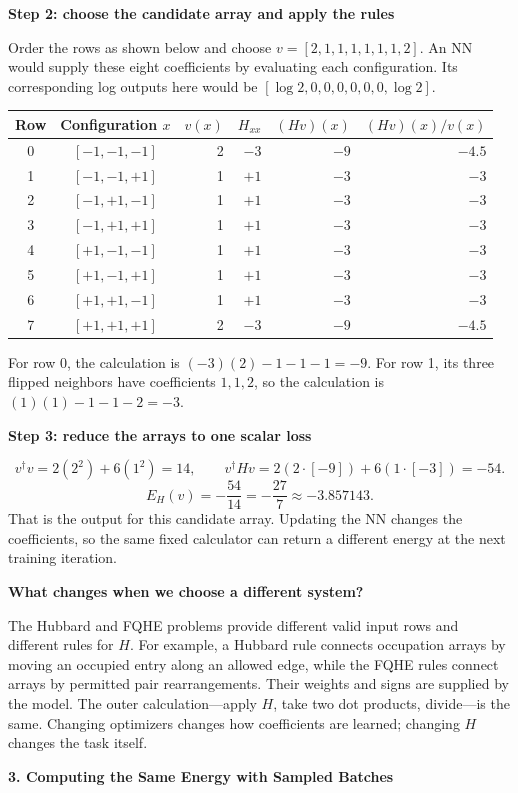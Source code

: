 \documentclass[11pt,letterpaper]{article}
\newcommand{\topic}[1]{\vspace{4pt}\textbf{\color{ink}#1}\par}
\newcommand{\pagetitle}[1]{\begin{center}{\Large\bfseries #1}\end{center}}
\begin{document}
\topic{Step 2: choose the candidate array and apply the rules}
Order the rows as shown below and choose $v=[2,1,1,1,1,1,1,2]$. An NN would supply these eight coefficients by evaluating each configuration. Its corresponding log outputs here would be $[\log2,0,0,0,0,0,0,\log2]$.
\begin{center}\small
\begin{tabular}{@{}ccrrrr@{}}
\toprule
Row & Configuration $x$ & $v(x)$ & $H_{xx}$ & $(Hv)(x)$ & $(Hv)(x)/v(x)$\\
\midrule
0 & $[-1,-1,-1]$ & 2 & $-3$ & $-9$ & $-4.5$\\
1 & $[-1,-1,+1]$ & 1 & $+1$ & $-3$ & $-3$\\
2 & $[-1,+1,-1]$ & 1 & $+1$ & $-3$ & $-3$\\
3 & $[-1,+1,+1]$ & 1 & $+1$ & $-3$ & $-3$\\
4 & $[+1,-1,-1]$ & 1 & $+1$ & $-3$ & $-3$\\
5 & $[+1,-1,+1]$ & 1 & $+1$ & $-3$ & $-3$\\
6 & $[+1,+1,-1]$ & 1 & $+1$ & $-3$ & $-3$\\
7 & $[+1,+1,+1]$ & 2 & $-3$ & $-9$ & $-4.5$\\
\bottomrule
\end{tabular}
\end{center}
For row 0, the calculation is $(-3)(2)-1-1-1=-9$. For row 1, its three flipped neighbors have coefficients $1,1,2$, so the calculation is $(1)(1)-1-1-2=-3$.

\topic{Step 3: reduce the arrays to one scalar loss}
\[
 v^\dagger v=2(2^2)+6(1^2)=14,\qquad
 v^\dagger Hv=2(2\cdot[-9])+6(1\cdot[-3])=-54.
\]
\[
 \boxed{E_H(v)=-\frac{54}{14}=-\frac{27}{7}\approx-3.857143.}
\]
That is the output for this candidate array. Updating the NN changes the coefficients, so the same fixed calculator can return a different energy at the next training iteration.

\topic{What changes when we choose a different system?}
The Hubbard and FQHE problems provide different valid input rows and different rules for $H$. For example, a Hubbard rule connects occupation arrays by moving an occupied entry along an allowed edge, while the FQHE rules connect arrays by permitted pair rearrangements. Their weights and signs are supplied by the model. The outer calculation---apply $H$, take two dot products, divide---is the same. Changing optimizers changes how coefficients are learned; changing $H$ changes the task itself.

\clearpage
\pagetitle{3. Computing the Same Energy with Sampled Batches}
\end{document}
